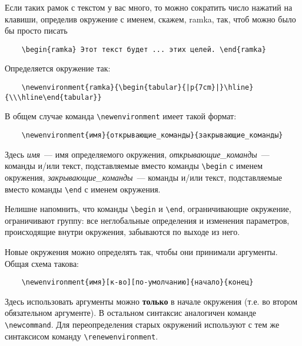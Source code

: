 \documentclass[a4paper,11pt]{article} %
\begin{document}
Если таких рамок с текстом у вас много, то можно сократить число нажатий на клавиши, определив окружение с именем, скажем, ramka, так, чтоб можно было бы просто писать
\begin{verbatim}
	\begin{ramka} Этот текст будет ... этих целей. \end{ramka}
\end{verbatim}
\newpage
\noindent Определяется окружение так:
\begin{verbatim}
	\newenvironment{ramka}{\begin{tabular}{|p{7cm}|}\hline}{\\\hline\end{tabular}}
\end{verbatim}

В общем случае команда \verb"\newenvironment" имеет такой формат:
\begin{verbatim}
	\newenvironment{имя}{открывающие_команды}{закрывающие_команды}
\end{verbatim}
Здесь {\it имя}~--- имя определяемого окружения, {\it открывающие\_команды}~--- команды и/или текст, подставляемые вместо команды \verb"\begin" с именем окружения, {\it закрывающие\_команды}~--- команды и/или текст, подставляемые вместо команды \verb"\end" с именем окружения.
{\sloppy

}

Нелишне напомнить, что команды \verb"\begin" и \verb"\end", ограничивающие окружение, ограничивают группу: все неглобальные определения и изменения параметров, происходящие внутри окружения, забываются по выходе из него.

Новые окружения можно определять так, чтобы они принимали аргументы. Общая схема такова:
\begin{verbatim}
	\newenvironment{имя}[к-во][по-умолчанию]{начало}{конец}
\end{verbatim}
Здесь использовать аргументы можно {\bf только} в начале окружения (т.е. во втором обязательном аргументе). В остальном синтаксис аналогичен команде \verb"\newcommand". Для переопределения старых окружений используют с тем же синтаксисом команду \verb"\renewenvironment".
{\sloppy

}
\end{document}
